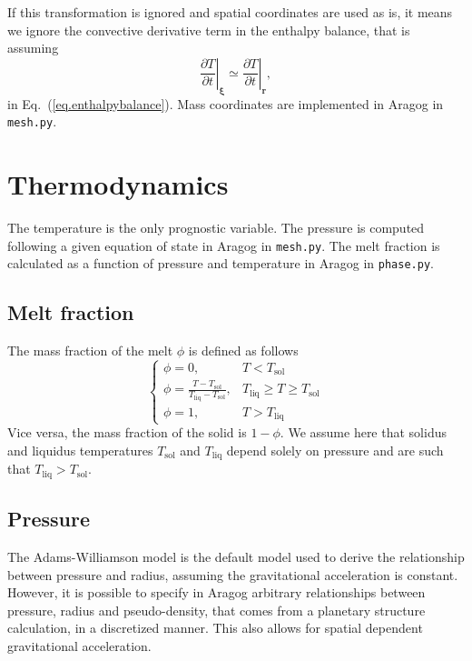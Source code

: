 \documentclass{article}
\renewcommand{\vec}[1]{\boldsymbol{#1}}
\begin{document}
If this transformation is ignored  and spatial coordinates are used as is, it means we ignore the convective derivative term in the enthalpy balance, that is assuming
\begin{equation}
    \left.\frac{\partial T}{\partial t}\right|_{\vec{\xi}} \simeq
    \left.\frac{\partial T}{\partial t}\right|_{\vec{r}},
\end{equation}
in Eq.~(\ref{eq.enthalpybalance}). Mass coordinates are implemented in Aragog in \texttt{mesh.py}.

\section{Thermodynamics}

The temperature is the only prognostic variable. The pressure is computed following a given equation of state in Aragog in \texttt{mesh.py}. The melt fraction is calculated as a function of pressure and temperature in Aragog in \texttt{phase.py}.

\subsection{Melt fraction}
The mass fraction of the melt $\phi$ is defined as follows
\begin{equation}
\begin{cases}
    \phi = 0, & T < T_\mathrm{sol} \\
    \phi= \frac{T-T_\mathrm{sol}}{T_\mathrm{liq}-T_\mathrm{sol}}, & T_\mathrm{liq} \geq T \geq T_\mathrm{sol}\\
    \phi = 1, & T > T_\mathrm{liq}
\end{cases}
\end{equation}
Vice versa, the mass fraction of the solid is $1-\phi$. We assume here that solidus and liquidus temperatures $T_\mathrm{sol}$ and $T_\mathrm{liq}$ depend solely on pressure and are such that $T_\mathrm{liq}>T_\mathrm{sol}$.

\subsection{Pressure}
\label{sec:thermoP}

The Adams-Williamson model is the default model used to derive the relationship between pressure and radius, assuming the gravitational acceleration is constant. However, it is possible to specify in Aragog arbitrary relationships between pressure, radius and pseudo-density, that comes from a planetary structure calculation, in a discretized manner. This also allows for spatial dependent gravitational acceleration.
\end{document}
